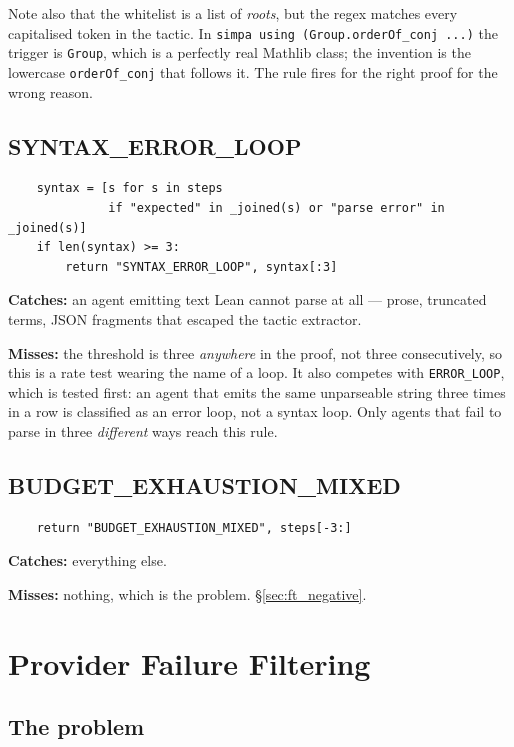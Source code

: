Note also that the whitelist is a list of \emph{roots}, but the regex matches
every capitalised token in the tactic. In
\texttt{simpa using (Group.orderOf\_conj ...)} the trigger is \texttt{Group},
which is a perfectly real Mathlib class; the invention is the lowercase
\texttt{orderOf\_conj} that follows it. The rule fires for the right proof for
the wrong reason.

\subsection{SYNTAX\_ERROR\_LOOP}

\begin{verbatim}
    syntax = [s for s in steps
              if "expected" in _joined(s) or "parse error" in _joined(s)]
    if len(syntax) >= 3:
        return "SYNTAX_ERROR_LOOP", syntax[:3]
\end{verbatim}

\noindent
\textbf{Catches:} an agent emitting text Lean cannot parse at all --- prose,
truncated terms, JSON fragments that escaped the tactic extractor.

\noindent
\textbf{Misses:} the threshold is three \emph{anywhere} in the proof, not three
consecutively, so this is a rate test wearing the name of a loop. It also
competes with \texttt{ERROR\_LOOP}, which is tested first: an agent that emits
the same unparseable string three times in a row is classified as an error loop,
not a syntax loop. Only agents that fail to parse in three \emph{different} ways
reach this rule.

\subsection{BUDGET\_EXHAUSTION\_MIXED}

\begin{verbatim}
    return "BUDGET_EXHAUSTION_MIXED", steps[-3:]
\end{verbatim}

\noindent
\textbf{Catches:} everything else.

\noindent
\textbf{Misses:} nothing, which is the problem. \S\ref{sec:ft_negative}.

\section{Provider Failure Filtering}
\label{sec:ft_provider}

\subsection{The problem}

